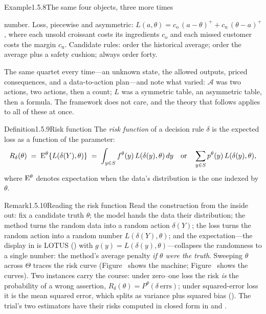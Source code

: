 \documentclass[main.tex]{subfiles}
\begin{document}
\begin{ObjL}{Example}{1.5.8}{The same four objects, three more times}
\begin{enumerate}[leftmargin=2.2em,itemsep=4pt,topsep=3pt,label=\textnormal{(\alph*)}]
        number. Loss, piecewise and asymmetric:
        $L(a,\theta)=c_{\mathrm{o}}\,(a-\theta)^{+}+c_{\mathrm{u}}\,(\theta-a)^{+}$, where
        each unsold croissant costs its ingredients $c_{\mathrm{o}}$ and each missed customer
        costs the margin $c_{\mathrm{u}}$. Candidate rules: order the historical average;
        order the average plus a safety cushion; always order forty.
\end{enumerate}
The same quartet every time---an unknown state, the allowed outputs, priced consequences, and
a data-to-action plan---and note what varied: $\mathcal{A}$ was two actions, two actions, then
a count; $L$ was a symmetric table, an asymmetric table, then a formula. The framework does
not care, and the theory that follows applies to all of these at once.
\end{ObjL}

\begin{Obj}{Definition}{1.5.9}{Risk function}
The \emph{risk function} of a decision rule $\delta$ is the expected loss as a function of the
parameter:
\[ R_{\delta}(\theta) \;=\; \mathrm{E}^{\theta}\{L(\delta(Y),\theta)\}
   \;=\; \int_{y\in S} f^{\theta}(y)\,L(\delta(y),\theta)\,dy
   \quad\text{or}\quad \sum_{y\in S} p^{\theta}(y)\,L(\delta(y),\theta), \]
where $\mathrm{E}^{\theta}$ denotes expectation when the data's distribution is the one indexed by
$\theta$.
\end{Obj}

\begin{ObjL}{Remark}{1.5.10}{Reading the risk function}
Read the construction from the inside out: fix a candidate truth $\theta$; the model hands the
data their distribution; the method turns the random data into a random action $\delta(Y)$;
the loss turns the random action into a random number $L(\delta(Y),\theta)$; and the
expectation---the display in  is LOTUS () with
$g(y)=L(\delta(y),\theta)$---collapses the randomness to a single number: the method's average
penalty \emph{if $\theta$ were the truth}. Sweeping $\theta$ across $\Theta$ traces the risk
curve (Figure~ shows the machine; Figure~ shows the curves). Two
instances carry the course: under zero--one loss the risk \emph{is} the probability of a wrong
assertion, $R_{\delta}(\theta)=P^{\theta}(\delta\ \text{errs})$; under squared-error loss it
is the mean squared error, which splits as variance plus squared bias (). The
trial's two estimators have their risks computed in closed form in  and
.
\end{ObjL}
\end{document}
